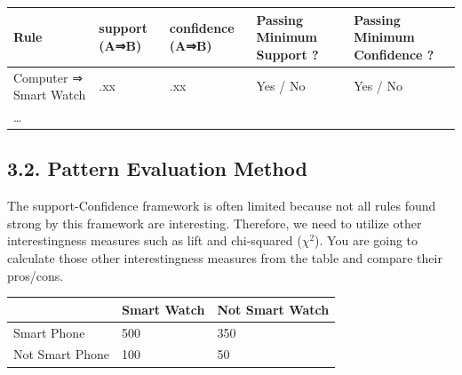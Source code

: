 \documentclass[
  letterpaper,
]{scrbook}
\newcounter{none} %
\begin{document}
{\def\LTcaptype{none} %
\begin{longtable}[]{@{}
  >{\raggedright\arraybackslash}p{}
  >{\raggedright\arraybackslash}p{}
  >{\raggedright\arraybackslash}p{}
  >{\raggedright\arraybackslash}p{}
  >{\raggedright\arraybackslash}p{}@{}}
\toprule\noalign{}
\begin{minipage}[b]{\linewidth}\raggedright
Rule
\end{minipage} & \begin{minipage}[b]{\linewidth}\raggedright
support (A⇒B)
\end{minipage} & \begin{minipage}[b]{\linewidth}\raggedright
confidence (A⇒B)
\end{minipage} & \begin{minipage}[b]{\linewidth}\raggedright
Passing Minimum Support ?
\end{minipage} & \begin{minipage}[b]{\linewidth}\raggedright
Passing Minimum Confidence ?
\end{minipage} \\
\midrule\noalign{}
\endhead
\bottomrule\noalign{}
\endlastfoot
Computer ⇒ Smart Watch & .xx & .xx & Yes / No & Yes / No \\
\ldots{} & & & & \\
\end{longtable}
}

\subsection*{3.2. Pattern Evaluation
Method}\label{pattern-evaluation-method}

The support-Confidence framework is often limited because not all rules
found strong by this framework are interesting. Therefore, we need to
utilize other interestingness measures such as lift and chi-squared
(\(χ^2\)). You are going to calculate those other interestingness
measures from the table and compare their pros/cons.

{\def\LTcaptype{none} %
\begin{longtable}[]{@{}lll@{}}
\toprule\noalign{}
& Smart Watch & Not Smart Watch \\
\midrule\noalign{}
\endhead
\bottomrule\noalign{}
\endlastfoot
Smart Phone & 500 & 350 \\
Not Smart Phone & 100 & 50 \\
\end{longtable}
}
\end{document}
